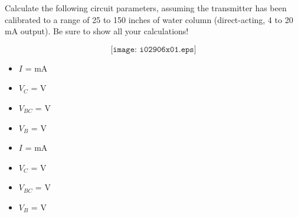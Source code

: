 

Calculate the following circuit parameters, assuming the transmitter has been calibrated to a range of 25 to 150 inches of water column (direct-acting, 4 to 20 mA output).  Be sure to show all your calculations!

$$\texttt{[image: i02906x01.eps]}$$

\begin{itemize}
\item{} $I$ = \underbar{\hskip 50pt} mA
\vskip 10pt
\item{} $V_{C}$ = \underbar{\hskip 50pt} V 
\vskip 10pt
\item{} $V_{BC}$ = \underbar{\hskip 50pt} V 
\vskip 10pt
\item{} $V_{B}$ = \underbar{\hskip 50pt} V 
\end{itemize}







\begin{itemize}
\item{} $I$ =  mA
\vskip 10pt
\item{} $V_{C}$ =  V 
\vskip 10pt
\item{} $V_{BC}$ =  V 
\vskip 10pt
\item{} $V_{B}$ =  V 
\end{itemize}











